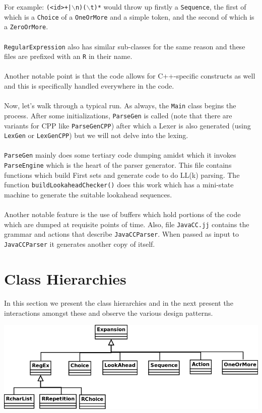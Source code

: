 \documentclass[oneside]{book}
\begin{document}
\noindent For example: \texttt{(<id>+|$\backslash$n)($\backslash$t)*} would throw up firstly a \texttt{Sequence}, the first of which is a \texttt{Choice} of a \texttt{OneOrMore} and a simple token, and the second of which is a \texttt{ZeroOrMore}.\\\\\texttt{RegularExpression} also has similar sub-classes for the same reason and these files are prefixed with an \texttt{R} in their name.\\\\Another notable point is that the code allows for C++-specific constructs as well and this is specifically handled everywhere in the code.\\\\Now, let's walk through a typical run. As always, the \texttt{Main} class begins the process. After some initializations, \texttt{ParseGen} is called (note that there are variants for CPP like \texttt{ParseGenCPP}) after which a Lexer is also generated (using \texttt{LexGen} or \texttt{LexGenCPP}) but we will not delve into the lexing.\\\\\texttt{ParseGen} mainly does some tertiary code dumping amidst which it invokes \texttt{ParseEngine} which is the heart of the parser generator. This file contains functions which build First sets and generate code to do LL(k) parsing. The function \texttt{buildLookaheadChecker()} does this work which has a mini-state machine to generate the suitable lookahead sequences.\\\\Another notable feature is the use of buffers which hold portions of the code which are dumped at requisite points of time. Also, file \texttt{JavaCC.jj} contains the grammar and actions that describe \texttt{JavaCCParser}. When passed as input to \texttt{JavaCCParser} it generates another copy of itself.

\section{Class Hierarchies}
In this section we present the class hierarchies and in the next present the interactions amongst these and observe the various design patterns.
\begin{center}
\includegraphics[scale=0.5]{Expansion.png}
\end{center}
\end{document}
